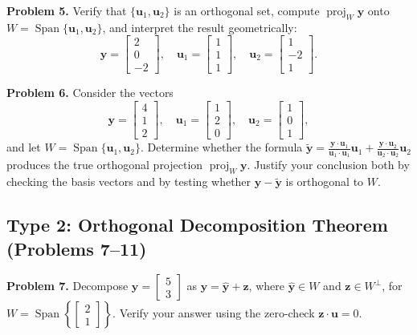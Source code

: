 \documentclass[11pt, letterpaper]{article}
\theoremstyle{definition}
\theoremstyle{remark}
\begin{document}
\textbf{Problem 5.} Verify that $\{\mathbf{u}_1, \mathbf{u}_2\}$ is an orthogonal set, compute $\operatorname{proj}_W \mathbf{y}$ onto $W = \operatorname{Span}\{\mathbf{u}_1, \mathbf{u}_2\}$, and interpret the result geometrically:
\[
\mathbf{y} = \begin{bmatrix} 2 \\ 0 \\ -2 \end{bmatrix}, \quad \mathbf{u}_1 = \begin{bmatrix} 1 \\ 1 \\ 1 \end{bmatrix}, \quad \mathbf{u}_2 = \begin{bmatrix} 1 \\ -2 \\ 1 \end{bmatrix}.
\]

\textbf{Problem 6.} Consider the vectors
\[
\mathbf{y} = \begin{bmatrix} 4 \\ 1 \\ 2 \end{bmatrix}, \quad \mathbf{u}_1 = \begin{bmatrix} 1 \\ 2 \\ 0 \end{bmatrix}, \quad \mathbf{u}_2 = \begin{bmatrix} 1 \\ 0 \\ 1 \end{bmatrix},
\]
and let $W = \operatorname{Span}\{\mathbf{u}_1, \mathbf{u}_2\}$. Determine whether the formula $\tilde{\mathbf{y}} = \frac{\mathbf{y}\cdot\mathbf{u}_1}{\mathbf{u}_1\cdot\mathbf{u}_1}\mathbf{u}_1 + \frac{\mathbf{y}\cdot\mathbf{u}_2}{\mathbf{u}_2\cdot\mathbf{u}_2}\mathbf{u}_2$ produces the true orthogonal projection $\operatorname{proj}_W \mathbf{y}$. Justify your conclusion both by checking the basis vectors and by testing whether $\mathbf{y} - \tilde{\mathbf{y}}$ is orthogonal to $W$.

\subsection{Type 2: Orthogonal Decomposition Theorem (Problems 7--11)}

\textbf{Problem 7.} Decompose $\mathbf{y} = \begin{bmatrix} 5 \\ 3 \end{bmatrix}$ as $\mathbf{y} = \hat{\mathbf{y}} + \mathbf{z}$, where $\hat{\mathbf{y}} \in W$ and $\mathbf{z} \in W^\perp$, for $W = \operatorname{Span}\left\{\begin{bmatrix} 2 \\ 1 \end{bmatrix}\right\}$. Verify your answer using the zero-check $\mathbf{z} \cdot \mathbf{u} = 0$.
\end{document}
